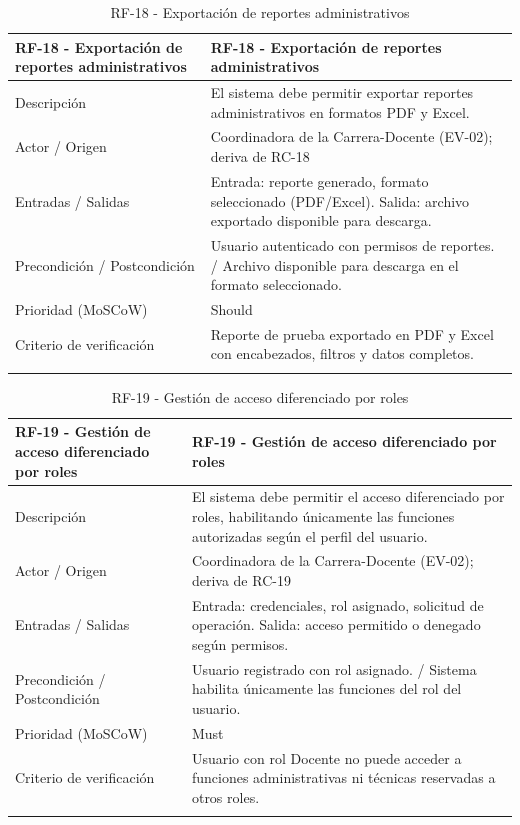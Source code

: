 \begingroup
\small
\begin{longtable}{|p{7.8cm}|p{7.8cm}|}
\hline
RF-18 - Exportación de reportes administrativos & RF-18 - Exportación de reportes administrativos \\ \hline
Descripción & El sistema debe permitir exportar reportes administrativos en formatos PDF y Excel. \\ \hline
Actor / Origen & Coordinadora de la Carrera-Docente (EV-02); deriva de RC-18 \\ \hline
Entradas / Salidas & Entrada: reporte generado, formato seleccionado (PDF/Excel). Salida: archivo exportado disponible para descarga. \\ \hline
Precondición / Postcondición & Usuario autenticado con permisos de reportes. / Archivo disponible para descarga en el formato seleccionado. \\ \hline
Prioridad (MoSCoW) & Should \\ \hline
Criterio de verificación & Reporte de prueba exportado en PDF y Excel con encabezados, filtros y datos completos. \\ \hline
\caption{RF-18 - Exportación de reportes administrativos}
\end{longtable}
\endgroup

\begingroup
\small
\begin{longtable}{|p{7.8cm}|p{7.8cm}|}
\hline
RF-19 - Gestión de acceso diferenciado por roles & RF-19 - Gestión de acceso diferenciado por roles \\ \hline
Descripción & El sistema debe permitir el acceso diferenciado por roles, habilitando únicamente las funciones autorizadas según el perfil del usuario. \\ \hline
Actor / Origen & Coordinadora de la Carrera-Docente (EV-02); deriva de RC-19 \\ \hline
Entradas / Salidas & Entrada: credenciales, rol asignado, solicitud de operación. Salida: acceso permitido o denegado según permisos. \\ \hline
Precondición / Postcondición & Usuario registrado con rol asignado. / Sistema habilita únicamente las funciones del rol del usuario. \\ \hline
Prioridad (MoSCoW) & Must \\ \hline
Criterio de verificación & Usuario con rol Docente no puede acceder a funciones administrativas ni técnicas reservadas a otros roles. \\ \hline
\caption{RF-19 - Gestión de acceso diferenciado por roles}
\end{longtable}
\endgroup

